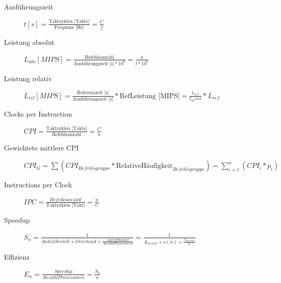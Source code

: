 \documentclass[10pt,landscape]{article}
\begin{document}
\begin{multicols}{2}
\footnotesize
\begin{description}
  \item[Ausführungszeit] $t[s]=\frac{\text{Taktzyklen [Takte]}}{\text{Frequenz [Hz]}} =\frac{C}{f}$
  \item[Leistung absolut] $L_{abs}[MIPS]=\frac{\text{Befehlsanzahl}}{\text{Ausführungszeit [s]}*10^6}=\frac{n}{t*10^6}$
  \item[Leistung relativ] $L_{rel}[MIPS]=\frac{\text{Referenzzeit [s]}}{\text{Ausführungszeit [s]}}*\text{RefLeistung [MIPS]} = \frac{t_{ref}}{t_mess}*L_{ref}$
  \item[Clocks per Instruction] $CPI=\frac{\text{Taktzyklen [Takte]}}{\text{Befehlsanzahl}} =\frac{C}{n}$
  \item[Gewichtete mittlere CPI] $CPI_{G}=\sum (CPI_{Befehlsgruppe}*\text{RelativeHäufigkeit}_{Befehlsgruppe})=\sum_{i=1}^n(CPI_i*p_i)$
  \item[Instructions per Clock] $IPC=\frac{Befehlsanzahl}{\text{Taktzyklen [Takt]}}=\frac{n}{C}$
  \item[Speedup] $S_n=\frac{1}{AnteilSeriell + Overhead + \frac{AnteilParallel}{AnzahlProzessoren}}=\frac{1}{ A_{seriell} + o(n) + \frac{ A_{parallel} }{ n }}$
  \item[Effizienz] $E_n=\frac{Speedup}{AnzahlProzessoren}=\frac{S_n}{n}$
\end{description}
\end{multicols}
\end{document}
